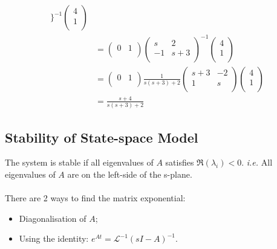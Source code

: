 \begin{itemize}
\begin{ex}{}
\begin{equation*}
\begin{aligned}
        \}^{-1}
        \begin{pmatrix}
        4\\
        1\\
        \end{pmatrix}\\
        &=\begin{pmatrix}
         0 & 1\\
        \end{pmatrix}
        \begin{pmatrix}
        s&2\\
        -1&s+3\\
        \end{pmatrix}
        ^{-1}
        \begin{pmatrix}
        4\\
        1\\
        \end{pmatrix}\\
        &=\begin{pmatrix}
         0 & 1\\
        \end{pmatrix}
        \frac{1}{s(s+3)+2}
        \begin{pmatrix}
        s+3&-2\\
        1&s\\
        \end{pmatrix}
        \begin{pmatrix}
        4\\
        1\\
        \end{pmatrix}\\
        &= \frac{s+4}{s(s+3)+2}
        \end{aligned}
        \end{equation*}
    \end{ex}
\end{itemize}


\subsection{Stability of State-space Model}
The system is stable if all eigenvalues of $A$ satisfies $\Re(\lambda_{i})<0$. \textit{i.e.} All eigenvalues of $A$ are on the left-side of the s-plane.\\\\
There are 2 ways to find the matrix exponential:
\begin{itemize}
    \item Diagonalisation of $A$;
    \item Using the identity: $e^{At} = \mathcal{L}^{-1}(sI-A)^{-1}$.
\end{itemize}


